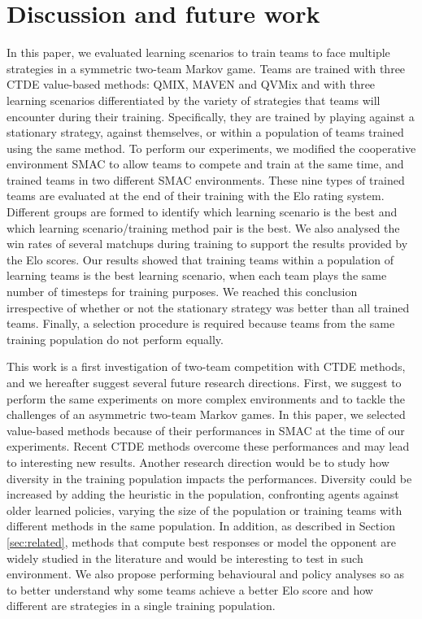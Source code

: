 \section{Discussion and future work}
In this paper, we evaluated learning scenarios to train teams to face multiple strategies in a symmetric two-team Markov game.
Teams are trained with three CTDE value-based methods: QMIX, MAVEN and QVMix and with three learning scenarios differentiated by the variety of strategies that teams will encounter during their training.
Specifically, they are trained by playing against a stationary strategy, against themselves, or within a population of teams trained using the same method.
To perform our experiments, we modified the cooperative environment SMAC to allow teams to compete and train at the same time, and trained teams in two different SMAC environments.
These nine types of trained teams are evaluated at the end of their training with the Elo rating system.
Different groups are formed to identify which learning scenario is the best and which learning scenario/training method pair is the best.
We also analysed the win rates of several matchups during training to support the results provided by the Elo scores.
Our results showed that training teams within a population of learning teams is the best learning scenario, when each team plays the same number of timesteps for training purposes.
We reached this conclusion irrespective of whether or not the stationary strategy was better than all trained teams.
Finally, a selection procedure is required because teams from the same training population do not perform equally.


This work is a first investigation of two-team competition with CTDE methods, and we hereafter suggest several future research directions.
First, we suggest to perform the same experiments on more complex environments and to tackle the challenges of an asymmetric two-team Markov games.
In this paper, we selected value-based methods because of their performances in SMAC \citep{samvelyan2019starcraft} at the time of our experiments.
Recent CTDE methods overcome these performances and may lead to interesting new results.
Another research direction would be to study how diversity in the training population impacts the performances. 
Diversity could be increased by adding the heuristic in the population, confronting agents against older learned policies, varying the size of the population or training teams with different methods in the same population.
In addition, as described in Section \ref{sec:related}, methods that compute best responses or model the opponent are widely studied in the literature and would be interesting to test in such environment.
We also propose performing behavioural and policy analyses so as to better understand why some teams achieve a better Elo score and how different are strategies in a single training population.

